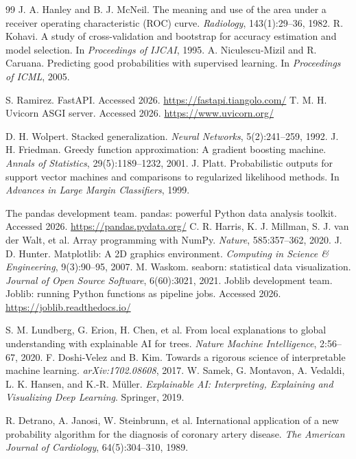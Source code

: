 \documentclass[12pt, a4paper, oneside]{book}
\begin{document}
\begin{thebibliography}{99}
 J. A. Hanley and B. J. McNeil. The meaning and use of the area under a receiver operating characteristic (ROC) curve. \textit{Radiology}, 143(1):29--36, 1982.
 R. Kohavi. A study of cross-validation and bootstrap for accuracy estimation and model selection. In \textit{Proceedings of IJCAI}, 1995.
 A. Niculescu-Mizil and R. Caruana. Predicting good probabilities with supervised learning. In \textit{Proceedings of ICML}, 2005.

 S. Ramirez. FastAPI. Accessed 2026. \url{https://fastapi.tiangolo.com/}
 T. M. H. Uvicorn ASGI server. Accessed 2026. \url{https://www.uvicorn.org/}

 D. H. Wolpert. Stacked generalization. \textit{Neural Networks}, 5(2):241--259, 1992.
 J. H. Friedman. Greedy function approximation: A gradient boosting machine. \textit{Annals of Statistics}, 29(5):1189--1232, 2001.
 J. Platt. Probabilistic outputs for support vector machines and comparisons to regularized likelihood methods. In \textit{Advances in Large Margin Classifiers}, 1999.

 The pandas development team. pandas: powerful Python data analysis toolkit. Accessed 2026. \url{https://pandas.pydata.org/}
 C. R. Harris, K. J. Millman, S. J. van der Walt, et al. Array programming with NumPy. \textit{Nature}, 585:357--362, 2020.
 J. D. Hunter. Matplotlib: A 2D graphics environment. \textit{Computing in Science \& Engineering}, 9(3):90--95, 2007.
 M. Waskom. seaborn: statistical data visualization. \textit{Journal of Open Source Software}, 6(60):3021, 2021.
 Joblib development team. Joblib: running Python functions as pipeline jobs. Accessed 2026. \url{https://joblib.readthedocs.io/}

 S. M. Lundberg, G. Erion, H. Chen, et al. From local explanations to global understanding with explainable AI for trees. \textit{Nature Machine Intelligence}, 2:56--67, 2020.
 F. Doshi-Velez and B. Kim. Towards a rigorous science of interpretable machine learning. \textit{arXiv:1702.08608}, 2017.
 W. Samek, G. Montavon, A. Vedaldi, L. K. Hansen, and K.-R. M{\"u}ller. \textit{Explainable AI: Interpreting, Explaining and Visualizing Deep Learning}. Springer, 2019.

 R. Detrano, A. Janosi, W. Steinbrunn, et al. International application of a new probability algorithm for the diagnosis of coronary artery disease. \textit{The American Journal of Cardiology}, 64(5):304--310, 1989.
\end{thebibliography}
\end{document}
